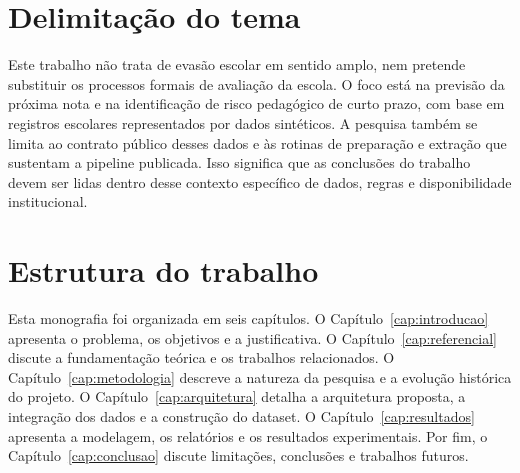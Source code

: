 \section{Delimita\c{c}\~ao do tema}
\label{sec:delimitacao}

Este trabalho n\~ao trata de evas\~ao escolar em sentido amplo, nem pretende substituir os processos formais de avalia\c{c}\~ao da escola. O foco est\'a na previs\~ao da pr\'oxima nota e na identifica\c{c}\~ao de risco pedag\'ogico de curto prazo, com base em registros escolares representados por dados sintéticos. A pesquisa tamb\'em se limita ao contrato p\'ublico desses dados e \`as rotinas de prepara\c{c}\~ao e extra\c{c}\~ao que sustentam a pipeline publicada. Isso significa que as conclus\~oes do trabalho devem ser lidas dentro desse contexto espec\'ifico de dados, regras e disponibilidade institucional.

\section{Estrutura do trabalho}
\label{sec:estrutura}

Esta monografia foi organizada em seis cap\'itulos. O Cap\'itulo~\ref{cap:introducao} apresenta o problema, os objetivos e a justificativa. O Cap\'itulo~\ref{cap:referencial} discute a fundamenta\c{c}\~ao te\'orica e os trabalhos relacionados. O Cap\'itulo~\ref{cap:metodologia} descreve a natureza da pesquisa e a evolu\c{c}\~ao hist\'orica do projeto. O Cap\'itulo~\ref{cap:arquitetura} detalha a arquitetura proposta, a integra\c{c}\~ao dos dados e a constru\c{c}\~ao do dataset. O Cap\'itulo~\ref{cap:resultados} apresenta a modelagem, os relat\'orios e os resultados experimentais. Por fim, o Cap\'itulo~\ref{cap:conclusao} discute limita\c{c}\~oes, conclus\~oes e trabalhos futuros.
